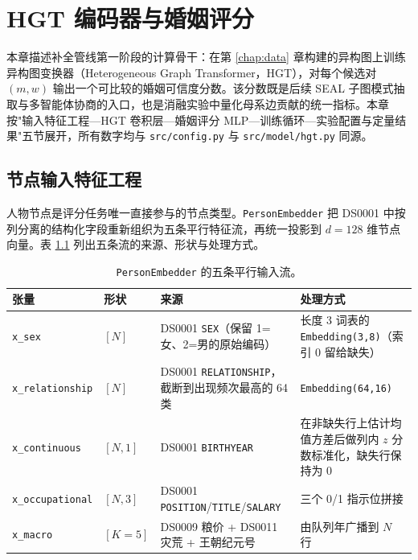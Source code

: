 \chapter{HGT 编码器与婚姻评分}\label{chap:hgt}

本章描述补全管线第一阶段的计算骨干：在第 \ref{chap:data} 章构建的异构图上训练异构图变换器（Heterogeneous Graph Transformer，HGT）\citep{hu2020hgt}，对每个候选对 \((m,w)\) 输出一个可比较的婚姻可信度分数。该分数既是后续 SEAL 子图模式抽取与多智能体协商的入口，也是消融实验中量化母系边贡献的统一指标。本章按"输入特征工程—HGT 卷积层—婚姻评分 MLP—训练循环—实验配置与定量结果"五节展开，所有数字均与 \texttt{src/config.py} 与 \texttt{src/model/hgt.py} 同源。

\section{节点输入特征工程}\label{sec:hgt-feature}

人物节点是评分任务唯一直接参与的节点类型。\texttt{PersonEmbedder} 把 DS0001 中按列分离的结构化字段重新组织为五条平行特征流，再统一投影到 \(d=128\) 维节点向量。表 \ref{tab:features} 列出五条流的来源、形状与处理方式。

\begin{table}[h]
\centering
\caption{\texttt{PersonEmbedder} 的五条平行输入流。}\label{tab:features}
\footnotesize
\begin{tabularx}{\linewidth}{@{}ll>{\raggedright\arraybackslash}X>{\raggedright\arraybackslash}X@{}}
\toprule
张量 & 形状 & 来源 & 处理方式 \\
\midrule
\texttt{x\_sex} & \([N]\) & DS0001 \texttt{SEX}（保留 1=女、2=男的原始编码） & 长度 3 词表的 \texttt{Embedding(3,8)}（索引 0 留给缺失） \\
\texttt{x\_relationship} & \([N]\) & DS0001 \texttt{RELATIONSHIP}，截断到出现频次最高的 64 类 & \texttt{Embedding(64,16)} \\
\texttt{x\_continuous} & \([N,1]\) & DS0001 \texttt{BIRTHYEAR} & 在非缺失行上估计均值方差后做列内 \(z\) 分数标准化，缺失行保持为 0 \\
\texttt{x\_occupational} & \([N,3]\) & DS0001 \texttt{POSITION}/\texttt{TITLE}/\texttt{SALARY} & 三个 0/1 指示位拼接 \\
\texttt{x\_macro} & \([K{=}5]\) & DS0009 粮价 + DS0011 灾荒 + 王朝纪元号 & 由队列年广播到 \(N\) 行 \\
\bottomrule
\end{tabularx}
\end{table}

